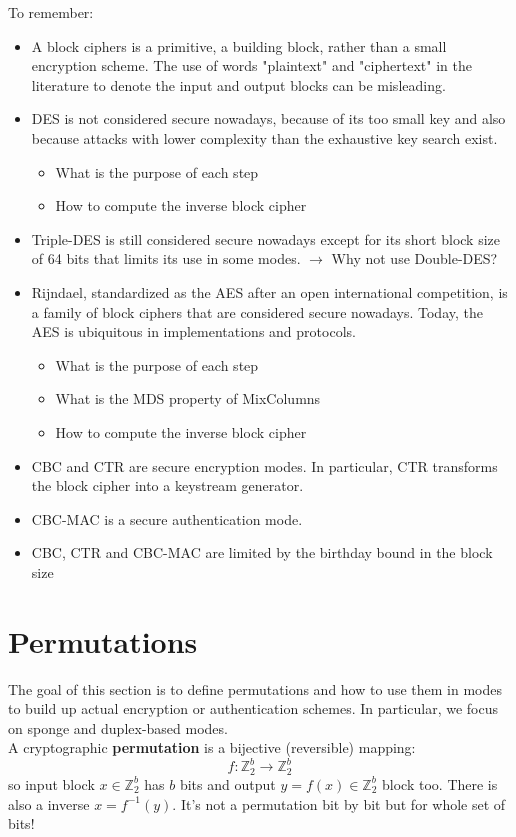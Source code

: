 \documentclass[11pt,a4paper]{report}
\begin{document}
To remember:
\begin{itemize}
\item A block ciphers is a primitive, a building block, rather than a small encryption scheme. The use of words "plaintext" and "ciphertext" in the literature to denote the input and output blocks can be misleading.
\item DES is not considered secure nowadays, because of its too small key and also because attacks with lower complexity than the exhaustive key search exist.
\begin{itemize}
\item What is the purpose of each step
\item How to compute the inverse block cipher
\end{itemize}
\item Triple-DES is still considered secure nowadays except for its short block size of 64 bits that limits its use in some modes. $\rightarrow$ Why not use Double-DES?
\item Rijndael, standardized as the AES after an open international competition, is a family of block ciphers that are considered secure nowadays. Today, the AES is ubiquitous in implementations and protocols.
\begin{itemize}
\item What is the purpose of each step
\item What is the MDS property of MixColumns
\item How to compute the inverse block cipher
\end{itemize}
\item CBC and CTR are secure encryption modes. In particular, CTR transforms the block cipher into a keystream generator.
\item CBC-MAC is a secure authentication mode.
\item CBC, CTR and CBC-MAC are limited by the birthday bound in the block size
\end{itemize}


\section{Permutations}
The goal of this section is to define permutations and how to use them in modes to build up actual encryption or authentication schemes. In particular, we focus on sponge and duplex-based modes.\\

A cryptographic \textbf{permutation} is  a bijective (reversible) mapping:
$$f : \mathbb{Z}_2^b \rightarrow \mathbb{Z}_2^b$$
so input block $x \in \mathbb{Z}_2^b$ has $b$ bits and output $y = f(x) \in \mathbb{Z}_2^b$ block too. There is also a inverse $x = f^{-1}(y)$. It's not a permutation bit by bit but for whole set of bits!\\
\end{document}
